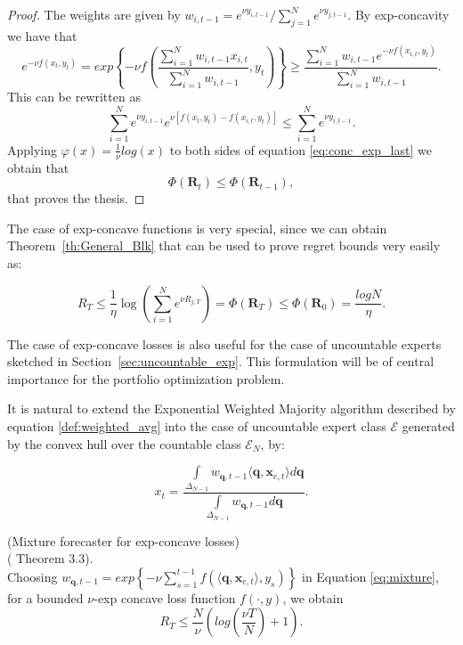 \begin{proof}
    The weights are given by $w_{i,t-1}=e^{\nu y_{i,t-1}}/\sum\limits_{j=1}^N e^{\nu y_{j,t-1}}$.
    By exp-concavity we have that
    \begin{equation}
        e^{-\nu f(x_t,y_t)}=exp\left\{-\nu f \left(\frac{\sum\limits_{i=1}^N w_{i,t-1}x_{i,t}}{\sum\limits_{i=1}^N w_{i,t-1}},y_t\right)\right\}\ge \frac{\sum\limits_{i=1}^N w_{i,t-1}e^{-\nu f(x_{i,t},y_t)}}{\sum\limits_{i=1}^N w_{i,t-1}}.
    \end{equation}
    This can be rewritten as 
    \begin{equation}\label{eq:conc_exp_last}
        \sum\limits_{i=1}^N e^{\nu y_{i,t-1}}e^{\nu [f(x_t,y_t)-f(x_{i,t},y_t)]}\le \sum\limits_{i=1}^N e^{\nu y_{i,t-1}}.
    \end{equation}
    Applying $\varphi(x)=\frac{1}{\nu}log(x)$ to both sides of equation \eqref{eq:conc_exp_last} we obtain that $$\Phi(\mathbf R_{t})\le \Phi(\mathbf R_{t-1}),$$ that proves the thesis.
\end{proof}

The case of exp-concave functions is very special, since we can obtain Theorem~\ref{th:General_Blk} that can be used to prove regret bounds very easily as:

\begin{equation}\label{eq:regret_exp_finite}
    R_T\le \frac{1}{\eta}\log\left(\sum\limits_{i=1}^N e^{\nu R_{j,T}}\right)=\Phi(\mathbf R_T)\le\Phi(\mathbf R_0) = \frac{log N}{\eta}.
\end{equation}

The case of exp-concave losses is also useful for the case of uncountable experts sketched in Section~\ref{sec:uncountable_exp}. This formulation will be of central importance for the portfolio optimization problem.

It is natural to extend the Exponential Weighted Majority algorithm described by equation \eqref{def:weighted_avg} into the case of uncountable expert class $\mathcal E$ generated by the convex hull over the countable class $\mathcal E_N$, by:

\begin{equation}\label{eq:mixture}
    x_t=\frac{\int\limits_{\Delta_{N-1}} w_{\mathbf q,t-1}\langle \mathbf q, \mathbf x_{e,t}\rangle d\mathbf q}{\int\limits_{\Delta_{N-1}} w_{\mathbf q,t-1}d\mathbf q}.
\end{equation}

\begin{theorem}(Mixture forecaster for exp-concave losses)\\
(\cite{cesa2006prediction} Theorem 3.3).\label{th:mixture_forecaster}\\
    Choosing $w_{\mathbf q,t-1}=exp\left\{-\nu\sum\limits_{s=1}^{t-1}f(\langle \mathbf q,\mathbf x_{e,t}\rangle,y_s)\right\}$ in Equation \eqref{eq:mixture}, for a bounded $\nu$-exp concave loss function $f(\cdot,y)$, we obtain
    $$R_T\le \frac{N}{\nu}\left(log\left(\frac{\nu T}{N}\right)+1\right).$$
\end{theorem}

